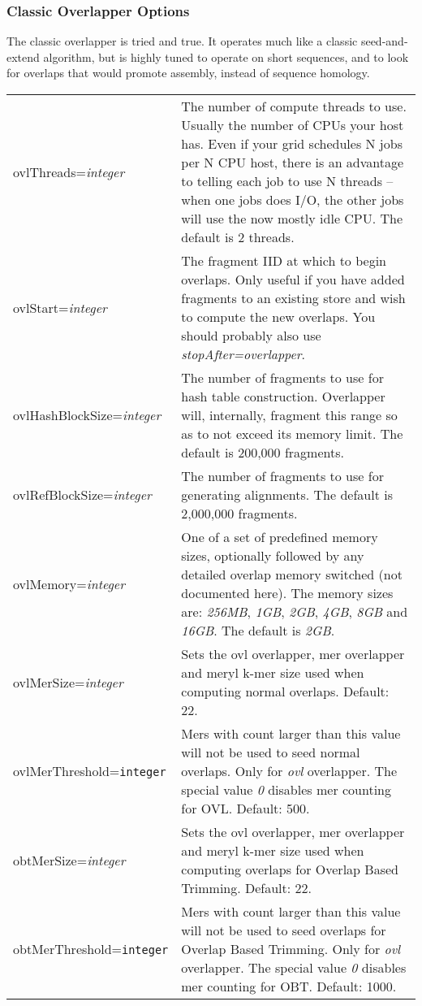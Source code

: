 \documentclass[twoside,11pt]{article}
\begin{document}
\subsubsection{Classic Overlapper Options}

The classic overlapper is tried and true.  It operates much like a
classic seed-and-extend algorithm, but is highly tuned to operate on
short sequences, and to look for overlaps that would promote assembly,
instead of sequence homology.

\begin{longtable}{lp{3.0in}}

ovlThreads={\it integer} &
The number of compute threads to use.  Usually the number of CPUs your
host has.  Even if your grid schedules N jobs per N CPU host, there is
an advantage to telling each job to use N threads -- when one jobs
does I/O, the other jobs will use the now mostly idle CPU.  The default is 2 threads.
\\

ovlStart={\it integer} &
The fragment IID at which to begin overlaps.  Only useful if you have
added fragments to an existing store and wish to compute the new
overlaps.  You should probably also use {\it stopAfter=overlapper}.
\\

ovlHashBlockSize={\it integer} &
The number of fragments to use for hash table construction.
Overlapper will, internally, fragment this range so as to not exceed
its memory limit.  The default is 200,000 fragments.
\\

ovlRefBlockSize={\it integer} &
The number of fragments to use for generating alignments.  The default
is 2,000,000 fragments.
\\

ovlMemory={\it integer} &
One of a set of predefined memory sizes, optionally followed by any
detailed overlap memory switched (not documented here).  The memory sizes are:
{\it 256MB}, {\it 1GB}, {\it 2GB}, {\it 4GB}, {\it 8GB} and {\it 16GB}.
The default is {\it 2GB}.
\\

ovlMerSize={\it integer} &
Sets the ovl overlapper, mer overlapper and meryl k-mer size used when
computing normal overlaps.  Default: 22.
\\

ovlMerThreshold={\tt integer} &
Mers with count larger than this value will not be used to seed
normal overlaps.  Only for {\em ovl} overlapper.  The special value {\it 0}
disables mer counting for OVL.  Default: 500.
\\

obtMerSize={\it integer} &
Sets the ovl overlapper, mer overlapper and meryl k-mer size used when
computing overlaps for Overlap Based Trimming.  Default: 22.
\\

obtMerThreshold={\tt integer} &
Mers with count larger than this value will not be used to seed
overlaps for Overlap Based Trimming.  Only for {\em ovl} overlapper.  The special value {\it 0}
disables mer counting for OBT.  Default: 1000.
\\
\end{longtable}
\end{document}
